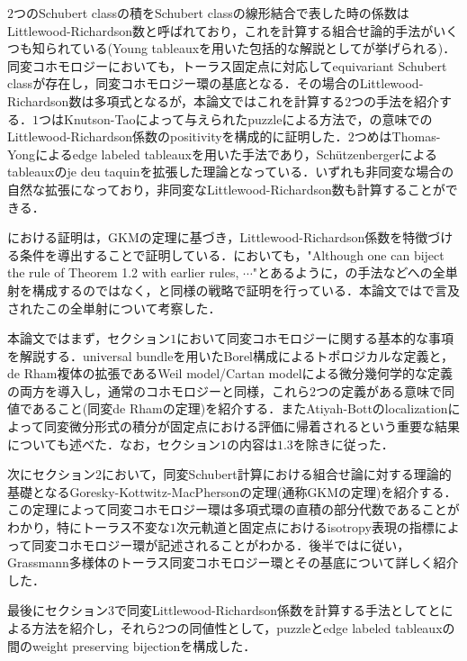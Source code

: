 $2$つのSchubert classの積をSchubert classの線形結合で表した時の係数はLittlewood-Richardson数と呼ばれており，これを計算する組合せ論的手法がいくつも知られている(Young tableauxを用いた包括的な解説として\cite{fulton young tableaux}が挙げられる)．同変コホモロジーにおいても，トーラス固定点に対応してequivariant Schubert classが存在し，同変コホモロジー環の基底となる．その場合のLittlewood-Richardson数は多項式となるが，本論文ではこれを計算する$2$つの手法を紹介する．$1$つはKnutson-Tao\cite{knutson tao}によって与えられたpuzzleによる方法で，\cite{positivity}の意味でのLittlewood-Richardson係数のpositivityを構成的に証明した．$2$つめはThomas-Yong\cite{thomas yong}によるedge labeled tableauxを用いた手法であり，Schützenberger\cite{schutzenberger}によるtableauxのje deu taquinを拡張した理論となっている．いずれも非同変な場合の自然な拡張になっており，非同変なLittlewood-Richardson数も計算することができる．

\cite{knutson tao}における証明は，GKMの定理に基づき，Littlewood-Richardson係数を特徴づける条件を導出することで証明している．\cite{thomas yong}においても，"Although one can biject the rule of Theorem 1.2
with earlier rules, $\cdots$"とあるように，\cite{knutson tao}の手法などへの全単射を構成するのではなく，\cite{knutson tao}と同様の戦略で証明を行っている．本論文では\cite{thomas yong}で言及されたこの全単射について考察した．

本論文ではまず，セクション$1$において同変コホモロジーに関する基本的な事項を解説する．universal bundleを用いたBorel構成によるトポロジカルな定義と，de Rham複体の拡張であるWeil model/Cartan modelによる微分幾何学的な定義の両方を導入し，通常のコホモロジーと同様，これら$2$つの定義がある意味で同値であること(同変de Rhamの定理)を紹介する．またAtiyah-Bottのlocalizationによって同変微分形式の積分が固定点における評価に帰着されるという重要な結果についても述べた．なお，セクション$1$の内容は$1.3$を除き\cite{tu equivariant}に従った．

次にセクション$2$において，同変Schubert計算における組合せ論に対する理論的基礎となるGoresky-Kottwitz-MacPhersonの定理(通称GKMの定理)を紹介する．この定理によって同変コホモロジー環は多項式環の直積の部分代数であることがわかり，特にトーラス不変な$1$次元軌道と固定点におけるisotropy表現の指標によって同変コホモロジー環が記述されることがわかる．後半では\cite{knutson tao}に従い，Grassmann多様体のトーラス同変コホモロジー環とその基底について詳しく紹介した．

最後にセクション$3$で同変Littlewood-Richardson係数を計算する手法として\cite{knutson tao}と\cite{thomas yong}による方法を紹介し，それら$2$つの同値性として，puzzleとedge labeled tableauxの間のweight preserving bijectionを構成した．